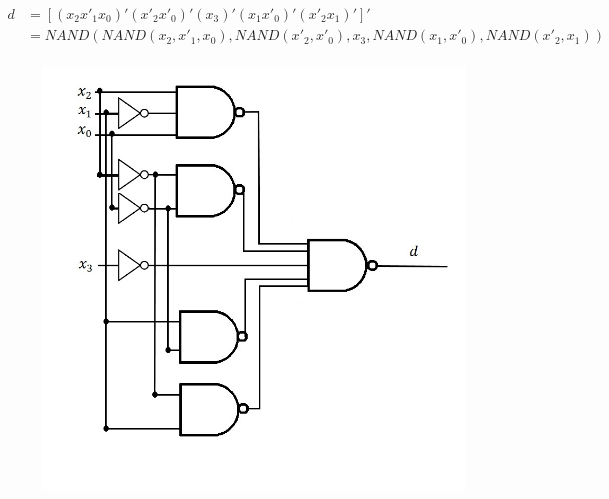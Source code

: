 \documentclass{article}
\begin{document}
\begin{equation*}
\begin{split}
d & = [ (x_2 x'_1 x_0)' (x'_2 x'_0)' (x_3)' (x_1 x'_0)' (x'_2 x_1)' ]' \\ 
  & = NAND(NAND(x_2, x'_1, x_0), NAND(x'_2, x'_0), x_3, NAND(x_1, x'_0), 
      NAND(x'_2, x_1)) \\
\end{split}
\end{equation*}
\begin{figure}[h!]
\centering
\includegraphics[scale=0.25]{d-NAND-NAND}
\end{figure}

\clearpage
\end{document}
